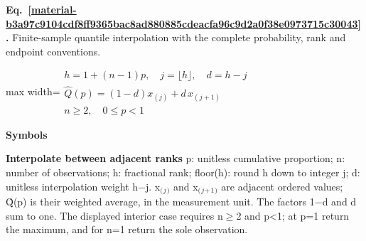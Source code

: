 \documentclass[11pt,a4paper]{article}
\begin{document}
\par\medskip
\begin{samepage}
\label{material-b3a97c9104cdf8ff9365bac8ad880885cdeacfa96c9d2a0f38e0973715c30043}
\noindent\textbf{Eq.~\ref*{material-b3a97c9104cdf8ff9365bac8ad880885cdeacfa96c9d2a0f38e0973715c30043}.} Finite-sample quantile interpolation with the complete probability, rank and endpoint conventions.\par\nopagebreak
\begin{center}\begin{adjustbox}{max width=\linewidth}$\displaystyle \begin{gathered}h=1+(n-1)p,\quad j=\lfloor h\rfloor,\quad d=h-j\\\widehat Q(p)=(1-d)x_{(j)}+d\,x_{(j+1)}\\ n\ge2,\quad 0\le p<1\end{gathered}$\end{adjustbox}\end{center}

\par\noindent\textbf{Symbols}

\par\noindent\textbf{Interpolate between adjacent ranks} p: unitless cumulative proportion; n: number of observations; h: fractional rank; floor(h): round h down to integer j; d: unitless interpolation weight h\ensuremath{-}j. x\ensuremath{{}_{(}}\ensuremath{{}_j}\ensuremath{{}_{)}} and x\ensuremath{{}_{(}}\ensuremath{{}_j}\ensuremath{{}_+}\ensuremath{{}_1}\ensuremath{{}_{)}} are adjacent ordered values; Q̂(p) is their weighted average, in the measurement unit. The factors 1\ensuremath{-}d and d sum to one. The displayed interior case requires n\ensuremath{\ge}2 and p<1; at p=1 return the maximum, and for n=1 return the sole observation.

\end{samepage}
\medskip
\end{document}
